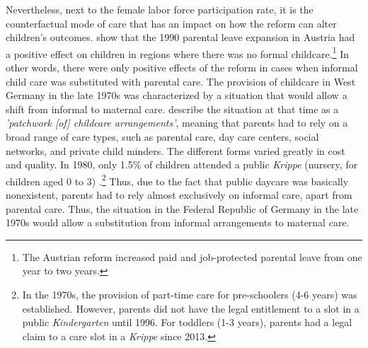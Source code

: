 \documentclass[11pt, a4paper]{article} %
\begin{document}
Nevertheless, next to the female labor force participation rate, it is the counterfactual mode of care that has an impact on how the reform can alter children's outcomes. \cite{danzer2019parental} show that the 1990 parental leave expansion in Austria had a positive effect on children in regions where there was no formal childcare.\footnote{The Austrian reform increased paid and job-protected parental leave from one year to two years.} In other words, there were only positive effects of the reform in cases when informal child care was substituted with parental care. The provision of childcare in West Germany in the late 1970s was characterized by a situation that would allow a shift from informal to maternal care. \cite{hank2001childcare} describe the situation at that time as a \textit{'patchwork [of] childcare arrangements'}, meaning that parents had to rely on a broad range of care types, such as parental care, day care centers, social networks, and private child minders. The different forms varied greatly in cost and quality. In 1980, only 1.5\% of children attended a public \textit{Krippe} (nursery, for children aged 0 to 3) \citep[p.~34]{bildungsbericht2006}.\footnote{In the 1970s, the provision of part-time care for pre-schoolers (4-6 years) was established. However, parents did not have the legal entitlement to a slot in a public \textit{Kindergarten} until 1996. For toddlers (1-3 years), parents had a legal claim to a care slot in a \textit{Krippe} since 2013.} Thus, due to the fact that public daycare was basically nonexistent, parents had to rely almost exclusively on informal care, apart from parental care. Thus, the situation in the Federal Republic of Germany in the late 1970s would allow a substitution from informal arrangements to maternal care. 




\bigskip
\end{document}
